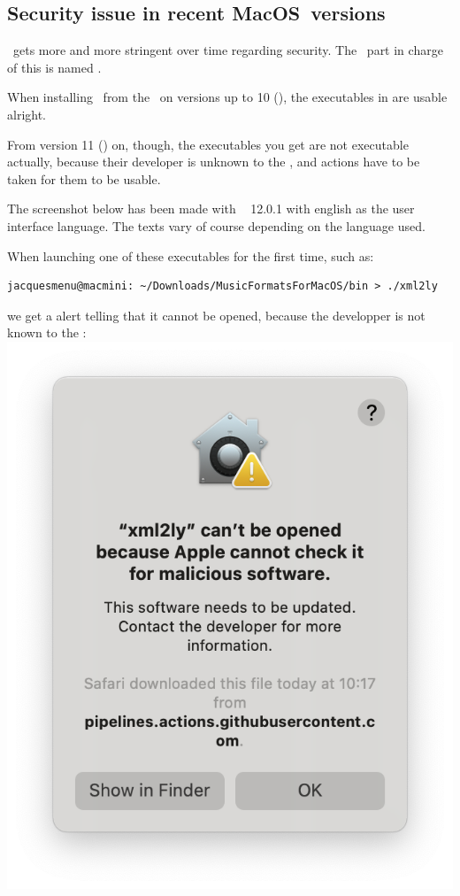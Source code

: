 \subsection{Security issue in recent MacOS\texttrademark\ versions}

\MacOS\ gets more and more stringent over time regarding security. The \OS\ part in charge of this is named \Gatekeeper.

When installing \mf\ from the \repo\ on versions up to 10 (), the executables in  are usable alright.

From version 11 () on, though, the executables you get are not executable actually, because their developer is unknown to the \OS, and actions have to be taken for them to be usable.

The screenshot below has been made with \MacOS\  12.0.1 with english as the user interface language. The texts vary of course depending on the language used.

When launching one of these executables for the first time, such as:
\begin{lstlisting}[language=Terminal]
jacquesmenu@macmini: ~/Downloads/MusicFormatsForMacOS/bin > ./xml2ly
\end{lstlisting}
we get a alert telling that it cannot be opened, because the developper is not known to the \OS:\\
\includegraphics[scale=0.35]{../graphics/MacOSMaliciousSoftwareAlert.png}

